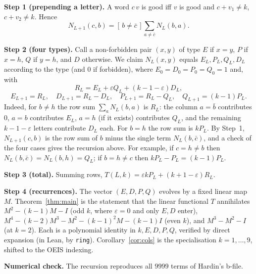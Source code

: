 \documentclass[11pt]{article}
\theoremstyle{remark}\newtheorem{remark}[theorem]{Remark}
\begin{document}
\textbf{Step 1 (prepending a letter).} A word $c\,v$ is good iff $v$ is good and $c+v_1\ne k$, $c+v_2\ne k$. Hence
\[N_{L+1}(c,b)=[\,b\ne\bar c\,]\sum_{a\ne\bar c}N_L(b,a).\]

\textbf{Step 2 (four types).} Call a non-forbidden pair $(x,y)$ of type $E$ if $x=y$, $P$ if $x=h$, $Q$ if $y=h$, and $D$ otherwise. We claim $N_L(x,y)$ equals $E_L,P_L,Q_L,D_L$ according to the type (and $0$ if forbidden), where $E_0=D_0=P_0=Q_0=1$ and, with
\[R_L=E_L+\varepsilon Q_L+(k-1-\varepsilon)D_L,\]
\[E_{L+1}=R_L,\quad D_{L+1}=R_L-D_L,\quad P_{L+1}=R_L-Q_L,\quad Q_{L+1}=(k-1)P_L.\]
Indeed, for $b\ne h$ the row sum $\sum_a N_L(b,a)$ is $R_L$: the column $a=\bar b$ contributes $0$, $a=b$ contributes $E_L$, $a=h$ (if it exists) contributes $Q_L$, and the remaining $k-1-\varepsilon$ letters contribute $D_L$ each. For $b=h$ the row sum is $kP_L$. By Step~1, $N_{L+1}(c,b)$ is the row sum of $b$ minus the single term $N_L(b,\bar c)$, and a check of the four cases gives the recursion above. For example, if $c=h\ne b$ then $N_L(b,\bar c)=N_L(b,h)=Q_L$; if $b=h\ne c$ then $kP_L-P_L=(k-1)P_L$.

\textbf{Step 3 (total).} Summing rows, $T(L,k)=\varepsilon kP_L+(k+1-\varepsilon)R_L$.

\textbf{Step 4 (recurrences).} The vector $(E,D,P,Q)$ evolves by a fixed linear map $M$. Theorem~\ref{thm:main} is the statement that the linear functional $T$ annihilates $M^2-(k-1)M-I$ (odd $k$, where $\varepsilon=0$ and only $E,D$ enter), $M^4-(k-2)M^3-M^2-(k-1)^2M-(k-1)I$ (even $k$), and $M^3-M^2-I$ (at $k=2$). Each is a polynomial identity in $k,E,D,P,Q$, verified by direct expansion (in Lean, by \texttt{ring}). Corollary~\ref{cor:cols} is the specialisation $k=1,\dots,9$, shifted to the OEIS indexing.

\textbf{Numerical check.} The recursion reproduces all $9999$ terms of Hardin's b-file.
\end{document}
